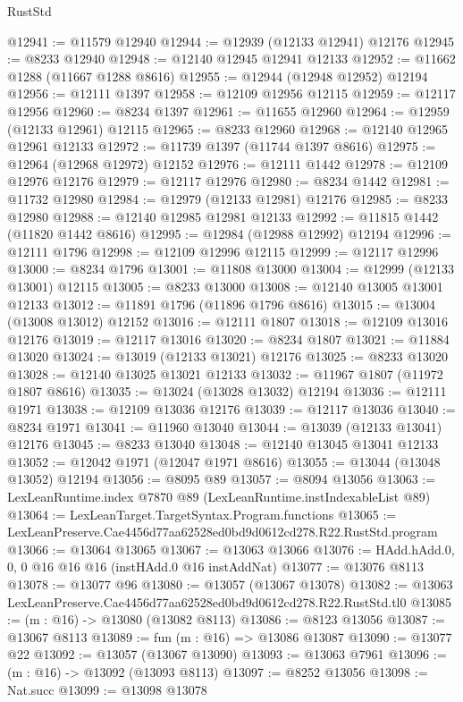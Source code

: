 \begin{lexlean}{RustStd}
\begin{coremodule}
@12941 := @11579 @12940
@12944 := @12939 (@12133 @12941) @12176
@12945 := @8233 @12940
@12948 := @12140 @12945 @12941 @12133
@12952 := @11662 @1288 (@11667 @1288 @8616)
@12955 := @12944 (@12948 @12952) @12194
@12956 := @12111 @1397
@12958 := @12109 @12956 @12115
@12959 := @12117 @12956
@12960 := @8234 @1397
@12961 := @11655 @12960
@12964 := @12959 (@12133 @12961) @12115
@12965 := @8233 @12960
@12968 := @12140 @12965 @12961 @12133
@12972 := @11739 @1397 (@11744 @1397 @8616)
@12975 := @12964 (@12968 @12972) @12152
@12976 := @12111 @1442
@12978 := @12109 @12976 @12176
@12979 := @12117 @12976
@12980 := @8234 @1442
@12981 := @11732 @12980
@12984 := @12979 (@12133 @12981) @12176
@12985 := @8233 @12980
@12988 := @12140 @12985 @12981 @12133
@12992 := @11815 @1442 (@11820 @1442 @8616)
@12995 := @12984 (@12988 @12992) @12194
@12996 := @12111 @1796
@12998 := @12109 @12996 @12115
@12999 := @12117 @12996
@13000 := @8234 @1796
@13001 := @11808 @13000
@13004 := @12999 (@12133 @13001) @12115
@13005 := @8233 @13000
@13008 := @12140 @13005 @13001 @12133
@13012 := @11891 @1796 (@11896 @1796 @8616)
@13015 := @13004 (@13008 @13012) @12152
@13016 := @12111 @1807
@13018 := @12109 @13016 @12176
@13019 := @12117 @13016
@13020 := @8234 @1807
@13021 := @11884 @13020
@13024 := @13019 (@12133 @13021) @12176
@13025 := @8233 @13020
@13028 := @12140 @13025 @13021 @12133
@13032 := @11967 @1807 (@11972 @1807 @8616)
@13035 := @13024 (@13028 @13032) @12194
@13036 := @12111 @1971
@13038 := @12109 @13036 @12176
@13039 := @12117 @13036
@13040 := @8234 @1971
@13041 := @11960 @13040
@13044 := @13039 (@12133 @13041) @12176
@13045 := @8233 @13040
@13048 := @12140 @13045 @13041 @12133
@13052 := @12042 @1971 (@12047 @1971 @8616)
@13055 := @13044 (@13048 @13052) @12194
@13056 := @8095 @89
@13057 := @8094 @13056
@13063 := LexLeanRuntime.index @7870 @89 (LexLeanRuntime.instIndexableList @89)
@13064 := LexLeanTarget.TargetSyntax.Program.functions
@13065 := LexLeanPreserve.Cae4456d77aa62528ed0bd9d0612cd278.R22.RustStd.program
@13066 := @13064 @13065
@13067 := @13063 @13066
@13076 := HAdd.hAdd.{0, 0, 0} @16 @16 @16 (instHAdd.{0} @16 instAddNat)
@13077 := @13076 @8113
@13078 := @13077 @96
@13080 := @13057 (@13067 @13078)
@13082 := @13063 LexLeanPreserve.Cae4456d77aa62528ed0bd9d0612cd278.R22.RustStd.tl0
@13085 := (m : @16) -> @13080 (@13082 @8113)
@13086 := @8123 @13056
@13087 := @13067 @8113
@13089 := fun (m : @16) => @13086 @13087
@13090 := @13077 @22
@13092 := @13057 (@13067 @13090)
@13093 := @13063 @7961
@13096 := (m : @16) -> @13092 (@13093 @8113)
@13097 := @8252 @13056
@13098 := Nat.succ
@13099 := @13098 @13078

\end{coremodule}
\end{lexlean}
